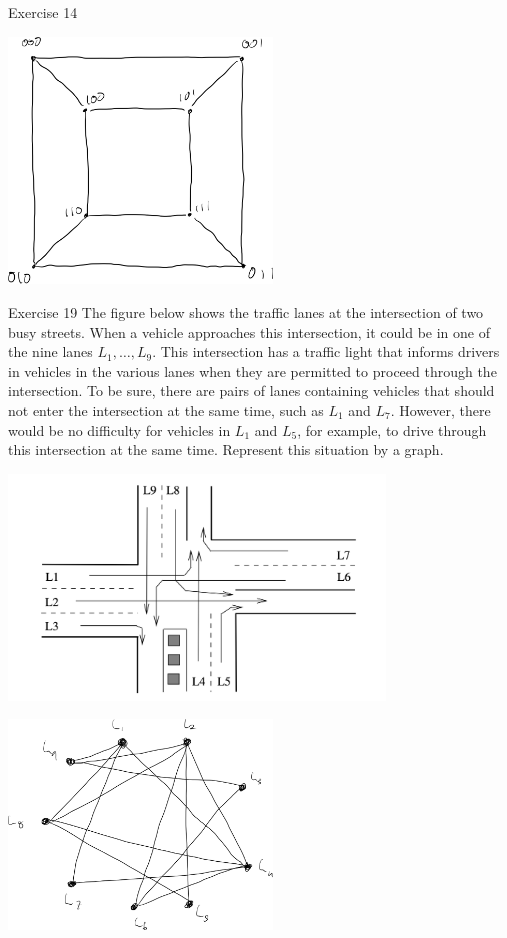 \documentclass[8pt]{extarticle}
\begin{document}
{\begin{problem}{Exercise 14}
    \begin{center}
      \includegraphics[width=7cm]{exercise_14_solution}
    \end{center}
  \end{problem}
  \begin{problem}{Exercise 19}
    The figure below shows the traffic lanes at the intersection of two busy streets. When a vehicle approaches this intersection, it could be in one of the nine lanes $L_1,\dots,L_9$. This intersection has a traffic light that informs drivers in vehicles in the various lanes when they are permitted to proceed through the intersection. To be sure, there are pairs of lanes containing vehicles that should not enter the intersection at the same time, such as $L_1$ and $L_7$. However, there would be no difficulty for vehicles in $L_1$ and $L_5$, for example, to drive through this intersection at the same time. Represent this situation by a graph.
    \begin{center}
      \includegraphics[width=10cm]{exercise_19}
    \end{center}
    \tcblower
    \begin{center}
      \includegraphics[width=7cm]{exercise_19_solution}
    \end{center}
  \end{problem}
}
\end{document}

